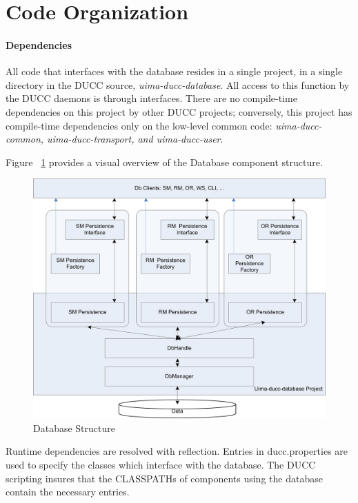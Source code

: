 \section{Code Organization}

    \paragraph{Dependencies} All code that interfaces with the database resides in a single project,
    in a single directory in the DUCC source, {\em uima-ducc-database}.  All access to this function
    by the DUCC daemons is through interfaces.  There are no compile-time dependencies on this
    project by other DUCC projects; conversely, this project has compile-time dependencies only on
    the low-level common code: {\em uima-ducc-common, uima-ducc-transport, and uima-ducc-user}.
    
    Figure ~\ref{fig:db-structure} provides a visual overview of the Database component structure.
    \begin{figure}[H]
      \centering
      \includegraphics[width=5.5in]{images/ducc-internals/db-structure.png}
      \caption{Database Structure}
      \label{fig:db-structure}
    \end{figure}


    Runtime dependencies are resolved with reflection.  Entries in ducc.properties
    are used to specify the classes which interface with the database.  The DUCC scripting
    insures that the CLASSPATHs of components using the database contain the 
    necessary entries.

